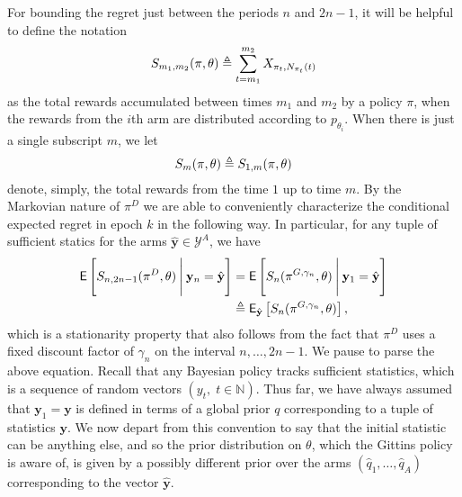 \begin{myproof}[Proof.]
	For bounding the regret just between the periods $n$ and $2n-1$, it will be helpful to define the notation 
	\[
		S_{m_1,m_2}(\pi, \theta) \defeq \sum_{t=m_1}^{m_2} X_{\pi_t,N_{\pi_t}(t)}
	\]
	as the total rewards accumulated between times $m_1$ and $m_2$ by a policy $\pi$, when the rewards from the $i$th arm are distributed according to $p_{\theta_i}$. When there is just a single subscript $m$, we let 
	\[S_m(\pi, \theta) \defeq S_{1,m}(\pi, \theta)\]
	denote, simply, the total rewards from the time $1$ up to time $m$. By the Markovian nature of $\pi^D$ we are able to conveniently characterize the conditional expected regret in epoch $k$ in the following way. In particular, for any tuple of sufficient statics for the arms $\hat{\mathbf y} \in \mathcal Y^A$, we have
	\begin{align}
		\E\left[S_{n,2n-1}(\pi^D, \theta) \given[\Bigg] \mathbf y_n = \hat {\mathbf y}\right] & =  \E\left[S_{n}(\pi^{G,\gamma_n}, \theta) \given[\Bigg] \mathbf y_1 = \hat {\mathbf y}\right] \nonumber \\
		& \defeq \E_{\hat{\mathbf y}}\left[S_{n}(\pi^{G,\gamma_n}, \theta) \right], \label{eqn:prop1_stationarity}
	\end{align}
	which is a stationarity property that also follows from the fact that $\pi^D$ uses a fixed discount factor of $\gamma_n$ on the interval $n,\ldots,2n-1$. We pause to parse the above equation. Recall that any Bayesian policy tracks sufficient statistics, which is a sequence of random vectors $\left(y_t, \; t \in \mathbb{N}\right)$. Thus far, we have always assumed that $\mathbf y_{1} = \mathbf y$ is defined in terms of a global prior $q$ corresponding to a tuple of statistics ${\mathbf y}$. We now depart from this convention to say that the initial statistic can be anything else, and so the prior distribution on $\theta$, which the Gittins policy is aware of, is given by a possibly different prior over the arms $(\hat q_1,\ldots,\hat q_A)$ corresponding to the vector $\hat {\mathbf y}$.
	

\end{myproof}
